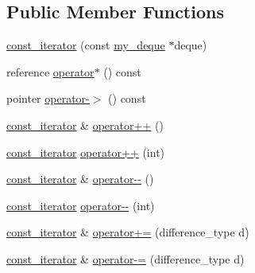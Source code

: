 \subsection*{Public Member Functions}
\begin{DoxyCompactItemize}
\item 
\hyperlink{classmy__deque_1_1const__iterator_a0da4ca9642023627ec6918afee3420cb}{const\-\_\-iterator} (const \hyperlink{classmy__deque}{my\-\_\-deque} $\ast$deque)
\item 
reference \hyperlink{classmy__deque_1_1const__iterator_a14715989004b54dc6a1bcd3d2ac78a20}{operator$\ast$} () const 
\item 
pointer \hyperlink{classmy__deque_1_1const__iterator_aef7e08cfcebb0c0932422f420645e1ce}{operator-\/$>$} () const 
\item 
\hyperlink{classmy__deque_1_1const__iterator}{const\-\_\-iterator} \& \hyperlink{classmy__deque_1_1const__iterator_a8bc45a394bb73728fca1ebf90755d662}{operator++} ()
\item 
\hyperlink{classmy__deque_1_1const__iterator}{const\-\_\-iterator} \hyperlink{classmy__deque_1_1const__iterator_adf9ea902391ac993088e7c969c64e4de}{operator++} (int)
\item 
\hyperlink{classmy__deque_1_1const__iterator}{const\-\_\-iterator} \& \hyperlink{classmy__deque_1_1const__iterator_ae5dffda4ac0a8ad59a4954dcdeeb5f98}{operator-\/-\/} ()
\item 
\hyperlink{classmy__deque_1_1const__iterator}{const\-\_\-iterator} \hyperlink{classmy__deque_1_1const__iterator_a83c405a1e0b9672c074aaa933a7127df}{operator-\/-\/} (int)
\item 
\hyperlink{classmy__deque_1_1const__iterator}{const\-\_\-iterator} \& \hyperlink{classmy__deque_1_1const__iterator_a2bbc121cc446855edcb9d20451cae024}{operator+=} (difference\-\_\-type d)
\item 
\hyperlink{classmy__deque_1_1const__iterator}{const\-\_\-iterator} \& \hyperlink{classmy__deque_1_1const__iterator_ab51576a76fd33fd55be87ca4c467dc96}{operator-\/=} (difference\-\_\-type d)
\end{DoxyCompactItemize}
